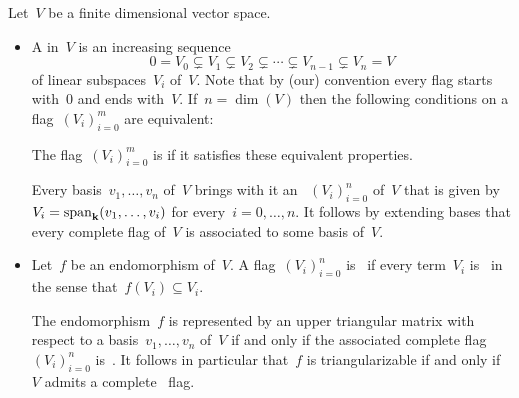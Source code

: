 \begin{recall}
  \label{triangular recall}
  Let~$V$ be a finite dimensional vector space.
  \begin{itemize}
    \item
      A  in~$V$ is an increasing sequence
      \[
        0
        =
        V_0
        \subsetneq
        V_1
        \subsetneq
        V_2
        \subsetneq
        \dotsb
        \subsetneq
        V_{n-1}
        \subsetneq
        V_n
        =
        V
      \]
      of linear subspaces~$V_i$ of~$V$.
      Note that by (our) convention every flag starts with~$0$ and ends with~$V$.
      If~$n = \dim(V)$ then the following conditions on a flag~$(V_i)_{i=0}^m$ are equivalent:
      The flag~$(V_i)_{i=0}^m$ is  if it satisfies these equivalent properties.
      
      Every basis~$v_1, \dotsc, v_n$ of~$V$ brings with it an ~$(V_i)_{i=0}^n$ of~$V$ that is given by~$V_i = \operatorname{span}_{\mathbf{k}}(v_1, \dotsc, v_i)$ for every~$i = 0, \dotsc, n$.
      It follows by extending bases that every complete flag of~$V$ is associated to some basis of~$V$.
      
    \item
      Let~$f$ be an endomorphism of~$V$.
      A flag~$(V_i)_{i=0}^n$ is~ if every term~$V_i$ is~{} in the sense that~$f(V_i) \subseteq V_i$.
      
      The endomorphism~$f$ is represented by an upper triangular matrix with respect to a basis~$v_1, \dotsc, v_n$ of~$V$ if and only if the associated complete flag~$(V_i)_{i=0}^n$ is~{}.
      It follows in particular that~$f$ is triangularizable if and only if~$V$ admits a complete~{} flag.
      

\end{itemize}
\end{recall}
